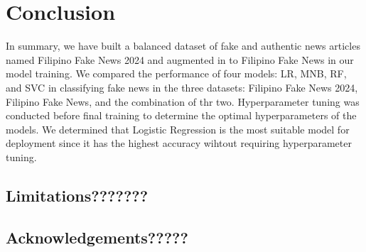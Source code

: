 \chapter{Conclusion}
In summary, we have built a balanced dataset of fake and authentic news articles named Filipino Fake News 2024 and augmented in to Filipino Fake News in our model training. We compared the performance of four models: LR, MNB, RF, and SVC in classifying fake news in the three datasets: Filipino Fake News 2024, Filipino Fake News, and the combination of thr two. Hyperparameter tuning was conducted before final training to determine the optimal hyperparameters of the models. We determined that Logistic Regression is the most suitable model for deployment since it has the highest accuracy wihtout requiring hyperparameter tuning.

\section{Limitations???????}
\section{Acknowledgements?????}